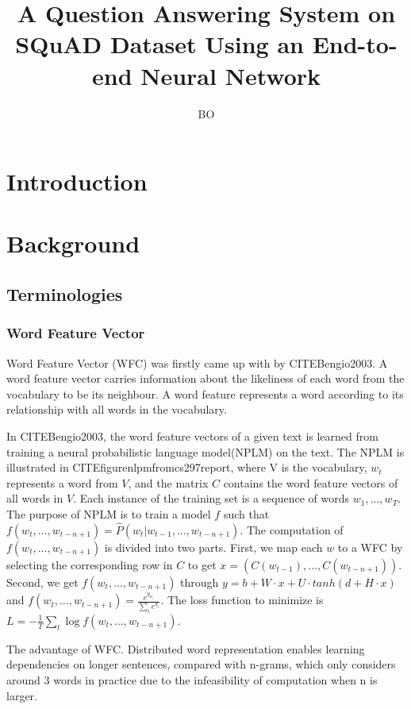 \documentclass[modernstyle,12pt]{sjsuthesis}
\title{A Question Answering System on SQuAD Dataset Using an End-to-end Neural Network}
\author{BO}{LI}
\theoremstyle{definition}
\begin{document}
\raggedright          %
\parindent=30pt       %




\chapter{Introduction}
\chapter{Background}
\section{Terminologies}

\subsection{Word Feature Vector}

Word Feature Vector (WFC) was firstly came up with by CITEBengio2003. A word feature vector carries information about the likeliness of each word from the vocabulary to be its neighbour. A word feature represents a word according to its relationship with all words in the vocabulary.

In CITEBengio2003, the word feature vectors of a given text is learned from training a neural probabilistic language model(NPLM) on the text. The NPLM is illustrated in CITEfigurenlpmfromcs297report, where V is the vocabulary, $w_t$ represents a word from $V$, and the matrix $C$ contains the word feature vectors of all words in $V$. Each instance of the training set is a sequence of words $w_1,...,w_T$. The purpose of NPLM is to train a model $f$ such that $ f(w_t, ..., w_{t-n+1}) = \hat{P}(w_t | w_{t-1},...,w_{t-n+1})$. The computation of $f(w_t, ..., w_{t-n+1})$ is divided into two parts.
First, we map each $w$ to a WFC by selecting the corresponding row in $C$ to get $x=(C(w_{t-1}),... ,C(w_{t-n+1}))$. Second, we get $f(w_t, ..., w_{t-n+1})$ through $y=b+W\cdot x + U\cdot tanh(d + H\cdot x)$ and $ f(w_t, ..., w_{t-n+1}) = \frac{e^{y_{w_t}}}{\sum_{i}^{}e^{y_i}}$. The loss function to minimize is $L = -\frac{1}{T}\sum _{t}^{} \log{f(w_t, ..., w_{t-n+1})}$.


The advantage of WFC. Distributed word representation enables learning dependencies on longer sentences, compared with n-grams, which only considers around 3 words in practice due to the infeasibility of computation when n is larger.
\end{document}
